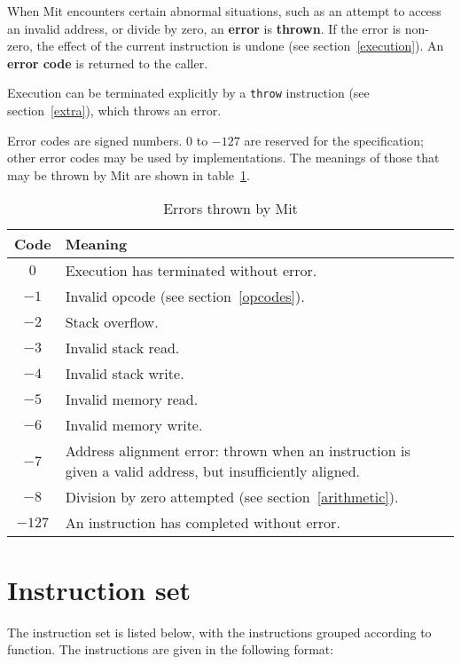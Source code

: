\documentclass[a4paper]{article}
\begin{document}
When Mit encounters certain abnormal situations, such as an attempt to access an invalid address, or divide by zero, an {\bf error} is {\bf thrown}. If the error is non-zero, the effect of the current instruction is undone (see section~\ref{execution}). An {\bf error code} is returned to the caller.

Execution can be terminated explicitly by a {\tt throw} instruction (see section~\ref{extra}), which throws an error.

Error codes are signed numbers. $0$ to $-127$ are reserved for the specification; other error codes may be used by implementations. The meanings of those that may be thrown by Mit are shown in table~\ref{errortable}.

\begin{table}[htbp]
\begin{center}
\begin{tabular}{cp{4in}} \toprule
\bf Code & \bf Meaning \\ \midrule
$0$ & Execution has terminated without error. \\
$-1$ & Invalid opcode (see section~\ref{opcodes}). \\
$-2$ & Stack overflow. \\
$-3$ & Invalid stack read. \\
$-4$ & Invalid stack write. \\
$-5$ & Invalid memory read. \\
$-6$ & Invalid memory write. \\
$-7$ & Address alignment error: thrown when an instruction is given a valid address, but insufficiently aligned. \\
$-8$ & Division by zero attempted (see section~\ref{arithmetic}). \\
$-127$ & An instruction has completed without error. \\
 \bottomrule
\end{tabular}
\caption{\label{errortable}Errors thrown by Mit}
\end{center}
\end{table}


\section{Instruction set}
\label{instset}

The instruction set is listed below,
with the instructions grouped according to function. The
instructions are given in the following format:
\end{document}
